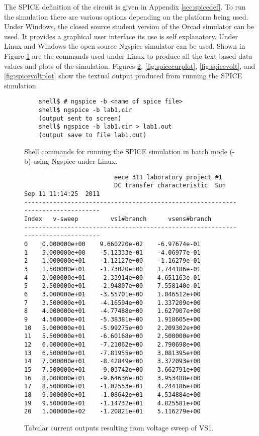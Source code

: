 \documentclass{article}
\begin{document}
The SPICE definition of the circuit is given in Appendix \ref{sec:spicedef}.
To run the simulation there are various options depending on the platform
being used.
Under Windows, the closed source student version of the
Orcad \cite{ORCAD} simulator can be used.
It provides a graphical user interface its use is self explanatory.
Under Linux and Windows the open source Ngspice \cite{NGSPICE}
simulator can be used.
Shown in Figure \ref{fig:ngspicelinux} are the commands used under Linux
to produce all the text based data values and plots of the simulation.
Figures \ref{fig:spicecur}, \ref{fig:spicecurplot}, \ref{fig:spicevolt},
and \ref{fig:spicevoltplot} show the textual output produced from running
the SPICE simulation.

\begin{figure}[!htb]
{\footnotesize
\begin{verbatim}
	shell$ # ngspice -b <name of spice file>
	shell$ ngspice -b lab1.cir
	(output sent to screen)
	shell$ ngspice -b lab1.cir > lab1.out
	(output save to file lab1.out)
\end{verbatim}
}
\caption{Shell commands for running the SPICE simulation in batch mode (-b)
using Ngspice under Linux.}
\label{fig:ngspicelinux}
\end{figure}

\begin{figure}
{\footnotesize
\begin{verbatim}
                         eece 311 laboratory project #1
                         DC transfer characteristic  Sun Sep 11 11:14:25  2011
--------------------------------------------------------------------------------
Index   v-sweep         vs1#branch      vsens#branch    
--------------------------------------------------------------------------------
0    0.000000e+00    9.660220e-02    -6.97674e-01    
1    5.000000e+00    -5.12333e-01    -4.06977e-01    
2    1.000000e+01    -1.12127e+00    -1.16279e-01    
3    1.500000e+01    -1.73020e+00    1.744186e-01    
4    2.000000e+01    -2.33914e+00    4.651163e-01    
5    2.500000e+01    -2.94807e+00    7.558140e-01    
6    3.000000e+01    -3.55701e+00    1.046512e+00    
7    3.500000e+01    -4.16594e+00    1.337209e+00    
8    4.000000e+01    -4.77488e+00    1.627907e+00    
9    4.500000e+01    -5.38381e+00    1.918605e+00    
10   5.000000e+01    -5.99275e+00    2.209302e+00    
11   5.500000e+01    -6.60168e+00    2.500000e+00    
12   6.000000e+01    -7.21062e+00    2.790698e+00    
13   6.500000e+01    -7.81955e+00    3.081395e+00    
14   7.000000e+01    -8.42849e+00    3.372093e+00    
15   7.500000e+01    -9.03742e+00    3.662791e+00    
16   8.000000e+01    -9.64636e+00    3.953488e+00    
17   8.500000e+01    -1.02553e+01    4.244186e+00    
18   9.000000e+01    -1.08642e+01    4.534884e+00    
19   9.500000e+01    -1.14732e+01    4.825581e+00    
20   1.000000e+02    -1.20821e+01    5.116279e+00    
\end{verbatim}
}
\caption{Tabular current outputs resulting from voltage sweep of VS1.}
\label{fig:spicecur}
\end{figure}
\end{document}
